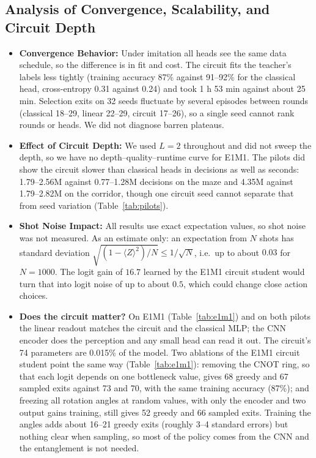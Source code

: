 \documentclass[10pt, a4paper]{article}
\begin{document}
\subsection{Analysis of Convergence, Scalability, and Circuit Depth}
\begin{itemize}
    \item \textbf{Convergence Behavior:} Under imitation all heads see the same data schedule, so the difference is in fit and cost. The circuit fits the teacher's labels less tightly (training accuracy 87\% against 91--92\% for the classical head, cross-entropy 0.31 against 0.24) and took 1 h 53 min against about 25 min. Selection exits on 32 seeds fluctuate by several episodes between rounds (classical 18--29, linear 22--29, circuit 17--26), so a single seed cannot rank rounds or heads. We did not diagnose barren plateaus.
    \item \textbf{Effect of Circuit Depth:} We used $L=2$ throughout and did not sweep the depth, so we have no depth--quality--runtime curve for E1M1. The pilots did show the circuit slower than classical heads in decisions as well as seconds: 1.79--2.56M against 0.77--1.28M decisions on the maze and 4.35M against 1.79--2.82M on the corridor, though one circuit seed cannot separate that from seed variation (Table~\ref{tab:pilots}).
    \item \textbf{Shot Noise Impact:} All results use exact expectation values, so shot noise was not measured. As an estimate only: an expectation from $N$ shots has standard deviation $\sqrt{(1-\langle Z\rangle^2)/N}\le 1/\sqrt{N}$, i.e.\ up to about $0.03$ for $N=1000$. The logit gain of $16.7$ learned by the E1M1 circuit student would turn that into logit noise of up to about $0.5$, which could change close action choices.
    \item \textbf{Does the circuit matter?} On E1M1 (Table~\ref{tab:e1m1}) and on both pilots the linear readout matches the circuit and the classical MLP; the CNN encoder does the perception and any small head can read it out. The circuit's 74 parameters are 0.015\% of the model. Two ablations of the E1M1 circuit student point the same way (Table~\ref{tab:e1m1}): removing the CNOT ring, so that each logit depends on one bottleneck value, gives 68 greedy and 67 sampled exits against 73 and 70, with the same training accuracy (87\%); and freezing all rotation angles at random values, with only the encoder and two output gains training, still gives 52 greedy and 66 sampled exits. Training the angles adds about 16--21 greedy exits (roughly 3--4 standard errors) but nothing clear when sampling, so most of the policy comes from the CNN and the entanglement is not needed.

\end{itemize}
\end{document}
